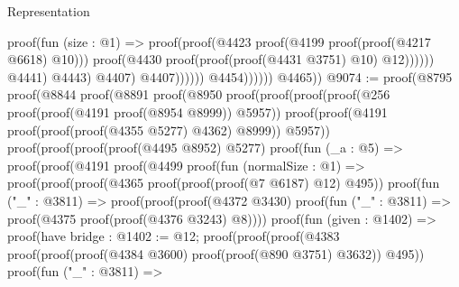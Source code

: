 \begin{lexlean}{Representation}
\begin{coremodule}
                                                  proof(fun (size : @1) =>
                                                    proof(proof(@4423
                                                          proof(@4199
                                                              proof(proof(@4217 @6618) @10)))
                                                        proof(@4430
                                                            proof(proof(proof(@4431 @3751) @10)
                                                                @12))))))
                                              @4441)
                                            @4443)
                                          @4407)
                                        @4407))))))
                        @4454))))))
        @4465))
@9074 := proof(@8795
      proof(@8844
          proof(@8891
              proof(@8950
                  proof(proof(proof(proof(@256 proof(proof(@4191 proof(@8954 @8999)) @5957))
                          proof(proof(@4191 proof(proof(proof(@4355 @5277) @4362) @8999)) @5957))
                        proof(proof(proof(proof(@4495 @8952) @5277)
                              proof(fun (_a : @5) =>
                                proof(proof(@4191
                                      proof(@4499
                                          proof(fun (normalSize : @1) =>
                                            proof(proof(proof(@4365
                                                    proof(proof(proof(@7 @6187) @12) @495))
                                                  proof(fun ("_" : @3811) =>
                                                    proof(proof(proof(@4372 @3430)
                                                          proof(fun ("_" : @3811) =>
                                                            proof(@4375
                                                                proof(proof(@4376 @3243) @8))))
                                                        proof(fun (given : @1402) =>
                                                          proof(have bridge : @1402 := @12;
                                                            proof(proof(proof(@4383
                                                                    proof(proof(proof(@4384 @3600)
                                                                          proof(proof(@890 @3751)
                                                                              @3632))
                                                                        @495))
                                                                  proof(fun ("_" : @3811) =>

\end{coremodule}
\end{lexlean}
